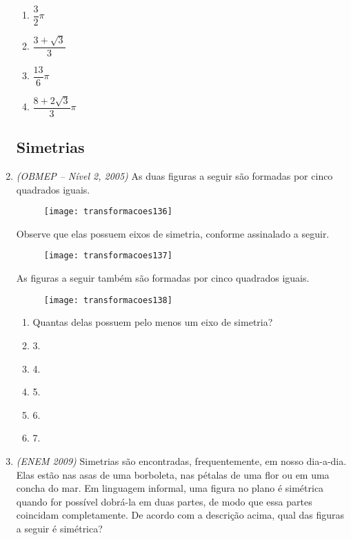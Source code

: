 \begin{enumerate}
\begin{enumerate}
\item $\dfrac{3}{2}\pi$
\item $\dfrac{3+\sqrt{3}}{3}$
\item $\dfrac{13}{6}\pi$
\item $\dfrac{8+2\sqrt{3}}{3}\pi$
\end{enumerate}

\subsection{Simetrias}

\item \textit{(OBMEP – Nível 2, 2005)} As duas figuras a seguir são formadas por cinco quadrados iguais.
\begin{figure}[H]
\centering

\texttt{[image: transformacoes136]}
\end{figure}

Observe que elas possuem eixos de simetria, conforme assinalado a seguir.
\begin{figure}[H]
\centering

\texttt{[image: transformacoes137]}
\end{figure}

As figuras a seguir também são formadas por cinco quadrados iguais.


\begin{figure}[H]
\centering

\texttt{[image: transformacoes138]}
\end{figure}

\begin{enumerate}
\item Quantas delas possuem pelo menos um eixo de simetria?
\item 3.
\item 4.
\item 5. 
\item 6.
\item 7.
\end{enumerate}

\item \textit{(ENEM 2009)} Simetrias são encontradas, frequentemente, em nosso dia-a-dia. Elas estão nas asas de uma borboleta, nas pétalas de uma flor ou em uma concha do mar. Em linguagem informal, uma figura no plano é simétrica quando for possível dobrá-la em duas partes, de modo que essa partes coincidam completamente. De acordo com a descrição acima, qual das figuras a seguir é simétrica?


\end{enumerate}
